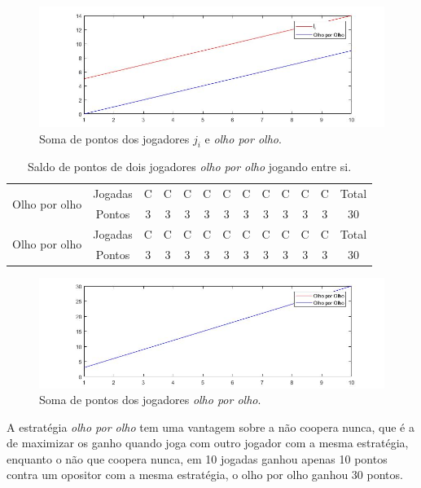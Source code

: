 \begin{figure}[H]
\centering
\includegraphics[width=14cm]{graf7.jpg}
\caption{Soma de pontos dos jogadores $j_i$ e \textit{olho por olho}.}
\label{fig7}
\end{figure}

\begin{table}[H]
\centering
\begin{tabular}{|c|c|c|c|c|c|c|c|c|c|c|c|c|}\hline
\multirow{2}{*}{Olho por olho} & Jogadas & C & C & C & C & C & C & C & C & C & C & Total\\\cline{2-12}
 & Pontos & 3 & 3 & 3 & 3 & 3 & 3 & 3 & 3 & 3 & 3 & 30\\\hline\hline
\multirow{2}{*}{Olho por olho} & Jogadas & C & C & C & C & C & C & C & C & C & C & Total\\\cline{2-12}
 & Pontos & 3 & 3 & 3 & 3 & 3 & 3 & 3 & 3 & 3 & 3 & 30\\\hline
\end{tabular}
\caption{Saldo de pontos de dois jogadores \textit{olho por olho} jogando entre si.}
\label{tab8}
\end{table}

\begin{figure}[H]
\centering
\includegraphics[width=14cm]{graf8.jpg}
\caption{Soma de pontos dos jogadores \textit{olho por olho}.}
\label{fig8}
\end{figure}

A estratégia \textit{olho por olho} tem uma vantagem sobre a não coopera nunca, que é a de maximizar os ganho quando joga com outro jogador com a mesma estratégia, enquanto o não que coopera nunca, em 10 jogadas ganhou apenas 10 pontos contra um opositor com a mesma estratégia, o olho por olho ganhou 30 pontos.

